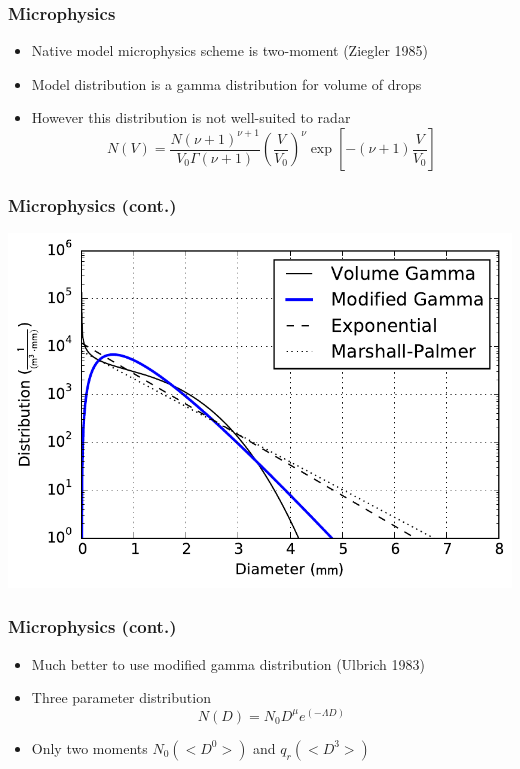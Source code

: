 \documentclass[red]{beamer}
\begin{document}
\begin{frame}[<+->]
	\frametitle{Microphysics}
	\begin{itemize}
		\item Native model microphysics scheme is two-moment (Ziegler 1985)
		\item Model distribution is a gamma distribution for volume of drops
		\item However this distribution is not well-suited to radar
		\begin{equation}
			N(V) = \frac{N (\nu + 1)^{\nu + 1}}{V_0 \Gamma(\nu + 1)}
        \left(\frac{V}{V_0}\right)^{\nu}
        \exp\left[{-(\nu + 1) \frac{V}{V_0}}\right]
		\end{equation}
	\end{itemize}
\end{frame}

\begin{frame}
	\frametitle{Microphysics (cont.)}
	\begin{center}
		\includegraphics[scale=0.6]{figures/distribution-comparison.pdf}
	\end{center}
\end{frame}

\begin{frame}[<+->]
	\frametitle{Microphysics (cont.)}
	\begin{itemize}
		\item Much better to use modified gamma distribution (Ulbrich 1983)
		\item Three parameter distribution
		\begin{equation}
			N(D) = N_0 D^\mu e^{(-\Lambda D)}
		\end{equation}
		\item Only two moments $N_0 (<D^0>)$ and $q_r (<D^3>)$
	\end{itemize}
\end{frame}
\end{document}
